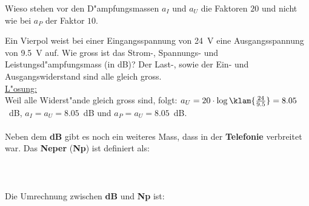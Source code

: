 \newpage
\vspace*{-9mm}\aufg 
Wieso stehen vor den D"ampfungsmassen $a_I$
und $a_U$ die Faktoren $20$ und nicht wie bei $a_P$ der Faktor $10$.
\vspace*{16mm}

{\bsp{~}
Ein Vierpol weist bei einer Eingangsspannung
von 24~V eine Ausgangsspannung von 9.5~V auf. Wie gross ist das
Strom-, Spannungs- und Leistungsd"ampfungsmass (in dB)? Der Last-,
sowie der Ein- und Ausgangswiderstand sind alle gleich gross.\\
\nit
\underline{L"osung:}\\ Weil alle Widerst"ande gleich gross sind,
folgt: $a_U = 20 \cdot \log \klam{\frac {24}{9.5}} = 8.05$~dB, $a_I = a_U = 8.05$~dB und $a_P = a_U = 8.05$~dB.\\~\\
\nit Neben dem {\bf dB} gibt es noch ein weiteres Mass, dass in der
{\bf Telefonie} verbreitet war. Das {\bf Neper}
({\bf Np}) ist definiert als:\\~\\
\\ ~\\
Die Umrechnung zwischen {\bf dB} und {\bf Np} ist:\\~\\
\\~\\

}
